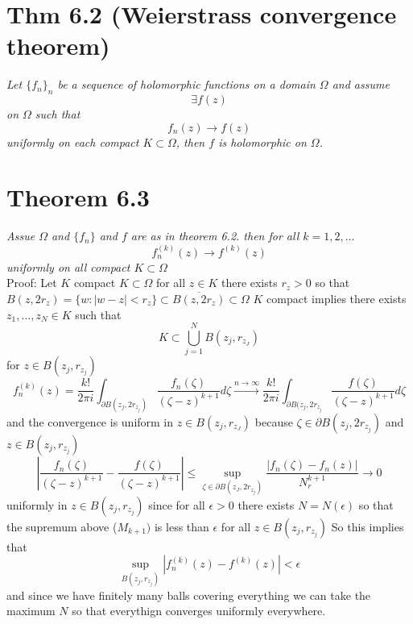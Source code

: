 \documentclass[11pt]{article}
\begin{document}
\section{Thm 6.2 (Weierstrass convergence theorem)}
\emph{
    Let $\{f_n\}_n$ be a sequence of holomorphic functions on a domain  $\Omega$ and assume
     \[
    \exists f(z)
    \] 
    on $\Omega$ such that
     \[
    f_n(z) \rightarrow f(z)
    \] 
    uniformly on each compact $K \subset \Omega$, then $f$ is holomorphic on $\Omega$.
}

\section{Theorem 6.3}
\emph{
    Assue $\Omega$ and  $\{f_n\}$ and  $f$ are as in theorem 6.2. then for all $k = 1,2,\dots$
     \[
    f_n^{(k)}(z) \rightarrow f^{(k)}(z)
    \] 
    uniformly on all compact  $K \subset \Omega$
}\\
Proof: Let $K$ compact  $K \subset \Omega$ for all $z \in K$ there exists  $r_z > 0$ so that  $B(z,2r_z) = \{w : |w-z| < r_z\} \subset \overline{B(z,2r_z)}  \subset\Omega$
$K$ compact implies there exists $z_1,\dots,z_N \in K$ such that
\[
K \subset \bigcup_{j=1}^{N}B(z_j,r_{z_J})
\] 
for $z \in B(z_j, r_{z_j})$
 \[
     f^{(k)}_n(z) = \frac{k!}{2\pi i} \int_{\partial B(z_j, 2r_{z_j})}^{} \frac{f_n(\zeta)}{(\zeta - z)^{k+1}}d \zeta \xrightarrow{n \to \infty} \frac{k!}{2\pi i} \int_{\partial B(z_j, 2r_{z_j}}^{} \frac{f(\zeta)}{(\zeta - z)^{k+1}}d \zeta
\] 
and the convergence is uniform in $z \in B(z_j, r_{z_J})$
because  $\zeta \in \partial B(z_j, 2r_{z_j})$ and $z \in B(z_j, r_{z_j})$ 
\[
    \left| \frac{f_n(\zeta)}{(\zeta - z)^{k+1}} - \frac{f(\zeta)}{(\zeta - z)^{k+1}} \right| \le \sup_{\zeta \in \partial B(z_J, 2 r_{z_j})} \frac{|f_n(\zeta) - f_n(z)|}{N_r^{k+1}} \rightarrow 0
\] 
uniformly in $z \in B(z_j, r_{z_j})$
since for all $\epsilon > 0$ there exists $N = N(\epsilon)$ so that  the supremum above ($M_{k+1})$ is less than  $\epsilon $ for all $z \in B(z_j,r_{z_j})$
So this implies that
\[
    \sup_{B(z_j,r_{z_j})} \left|f_n^{(k)}(z) - f^{(k)}(z)\right| < \epsilon
\] 
and since we have finitely many balls covering everything we can take the maximum $N$ so that everythign converges uniformly everywhere.
\end{document}
